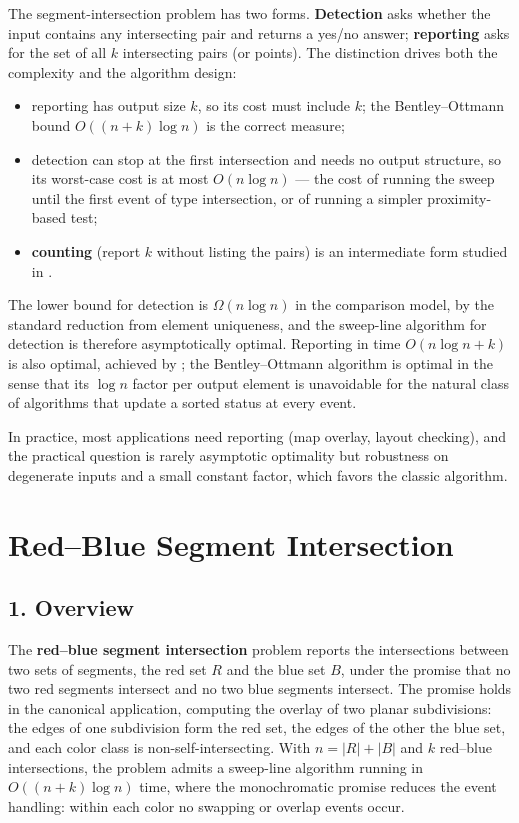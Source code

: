 The segment-intersection problem has two forms. \textbf{Detection} asks
whether the input contains any intersecting pair and returns a yes/no
answer; \textbf{reporting} asks for the set of all $k$ intersecting pairs
(or points). The distinction drives both the complexity and the algorithm
design:
\begin{itemize}
  \item reporting has output size $k$, so its cost must include $k$;
    the Bentley--Ottmann bound $O((n+k)\log n)$ is the correct measure;
  \item detection can stop at the first intersection and needs no output
    structure, so its worst-case cost is at most $O(n\log n)$ --- the cost
    of running the sweep until the first event of type intersection, or of
    running a simpler proximity-based test;
  \item \textbf{counting} (report $k$ without listing the pairs) is an
    intermediate form studied in \cite{bentley1979,chazelle1992}.
\end{itemize}
The lower bound for detection is $\Omega(n\log n)$ in the comparison model,
by the standard reduction from element uniqueness, and the sweep-line
algorithm for detection is therefore asymptotically optimal. Reporting in
time $O(n\log n + k)$ is also optimal, achieved by \cite{chazelle1992,
balaban1995}; the Bentley--Ottmann algorithm is optimal in the sense that
its $\log n$ factor per output element is unavoidable for the natural
class of algorithms that update a sorted status at every event.

In practice, most applications need reporting (map overlay, layout
checking), and the practical question is rarely asymptotic optimality but
robustness on degenerate inputs and a small constant factor, which favors
the classic algorithm.


\section{Red--Blue Segment Intersection}
\label{sec:segint_red_blue}

\subsection{1. Overview}

The \textbf{red--blue segment intersection} problem \cite{mairson1988}
reports the intersections between two sets of segments, the red set $R$ and
the blue set $B$, under the promise that no two red segments intersect and
no two blue segments intersect. The promise holds in the canonical
application, computing the overlay of two planar subdivisions: the edges of
one subdivision form the red set, the edges of the other the blue set, and
each color class is non-self-intersecting. With $n = |R| + |B|$ and $k$
red--blue intersections, the problem admits a sweep-line algorithm running
in $O((n+k)\log n)$ time, where the monochromatic promise reduces the event
handling: within each color no swapping or overlap events occur.


